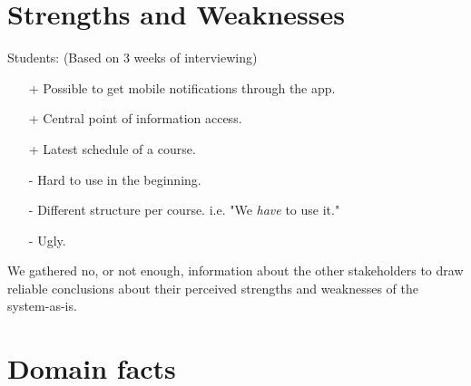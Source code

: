\section{Strengths and Weaknesses}
Students: (Based on 3 weeks of interviewing)
\begin{itemize}
	\item[+] Possible to get mobile notifications through the app.
    \item[+] Central point of information access.
	\item[+] Latest schedule of a course.
	\item[-] Hard to use in the beginning.
	\item[-] Different structure per course.
  i.e. "We \textit{have} to use it."
	\item[-] Ugly.
\end{itemize}

We gathered no, or not enough, information about the other stakeholders to draw reliable conclusions about their perceived strengths and weaknesses of the system-as-is.


\section{Domain facts}
\label{domain_facts}

